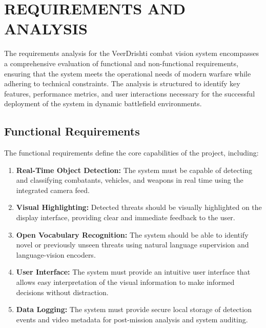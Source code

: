 \chapter{REQUIREMENTS AND ANALYSIS}
The requirements analysis for the VeerDrishti combat vision system encompasses a comprehensive evaluation of functional and non-functional requirements, ensuring that the system meets the operational needs of modern warfare while adhering to technical constraints. The analysis is structured to identify key features, performance metrics, and user interactions necessary for the successful deployment of the system in dynamic battlefield environments.

\section{Functional Requirements}
The functional requirements define the core capabilities of the project, including:
\begin{enumerate}[label=\roman*.]
    \item \textbf{Real-Time Object Detection:} The system must be capable of detecting and classifying combatants, vehicles, and weapons in real time using the integrated camera feed.
    \item \textbf{Visual Highlighting:} Detected threats should be visually highlighted on the display interface, providing clear and immediate feedback to the user.
    \item \textbf{Open Vocabulary Recognition:} The system should be able to identify novel or previously unseen threats using natural language supervision and language-vision encoders.
    \item \textbf{User Interface:} The system must provide an intuitive user interface that allows easy interpretation of the visual information to make informed decisions without distraction.
    \item \textbf{Data Logging:} The system must provide secure local storage of detection events and video metadata for post-mission analysis and system auditing.
\end{enumerate}

